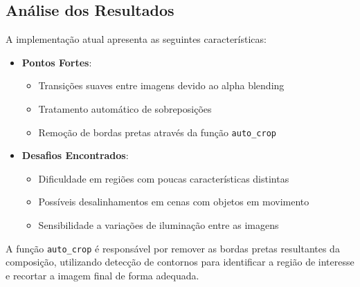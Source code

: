 \documentclass[12pt]{article}
\begin{document}
\subsection{Análise dos Resultados}
A implementação atual apresenta as seguintes características:

\begin{itemize}
    \item \textbf{Pontos Fortes}:
    \begin{itemize}
        \item Transições suaves entre imagens devido ao alpha blending
        \item Tratamento automático de sobreposições
        \item Remoção de bordas pretas através da função \texttt{auto\_crop}
    \end{itemize}
    
    \item \textbf{Desafios Encontrados}:
    \begin{itemize}
        \item Dificuldade em regiões com poucas características distintas
        \item Possíveis desalinhamentos em cenas com objetos em movimento
        \item Sensibilidade a variações de iluminação entre as imagens
    \end{itemize}
\end{itemize}

A função \texttt{auto\_crop} é responsável por remover as bordas pretas resultantes da composição, utilizando detecção de contornos para identificar a região de interesse e recortar a imagem final de forma adequada.



\end{document}
